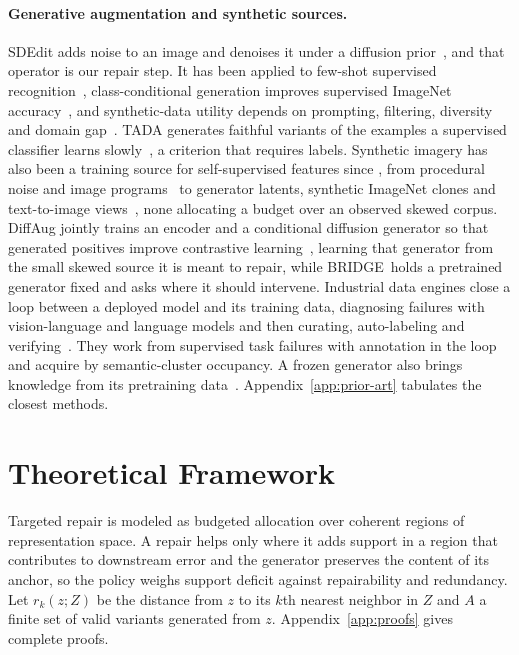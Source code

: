 \documentclass{article}
\newcommand{\method}{BRIDGE}
\begin{document}
\paragraph{Generative augmentation and synthetic sources.}
SDEdit adds noise to an image and denoises it under a diffusion prior~\citep{ho2020denoising,rombach2022highresolution,meng2022sdedit}, and that operator is our repair step. It has been applied to few-shot supervised recognition~\citep{trabucco2023effective}, class-conditional generation improves supervised ImageNet accuracy~\citep{azizi2023synthetic}, and synthetic-data utility depends on prompting, filtering, diversity and domain gap~\citep{he2023synthetic,fan2024scaling}. TADA generates faithful variants of the examples a supervised classifier learns slowly~\citep{nguyen2026tada}, a criterion that requires labels. Synthetic imagery has also been a training source for self-supervised features since \citet{ren2018crossdomain}, from procedural noise and image programs~\citep{baradad2021noise,baradad2022procedural} to generator latents, synthetic ImageNet clones and text-to-image views~\citep{jahanian2022generative,sariyildiz2023fake,tian2023stablerep}, none allocating a budget over an observed skewed corpus. DiffAug jointly trains an encoder and a conditional diffusion generator so that generated positives improve contrastive learning~\citep{zang2024diffaug}, learning that generator from the small skewed source it is meant to repair, while \method\ holds a pretrained generator fixed and asks where it should intervene. Industrial data engines close a loop between a deployed model and its training data, diagnosing failures with vision-language and language models and then curating, auto-labeling and verifying~\citep{liang2024aide,worker2022omniverse}. They work from supervised task failures with annotation in the loop and acquire by semantic-cluster occupancy. A frozen generator also brings knowledge from its pretraining data~\citep{li2023dreamteacher,tang2023dift,yu2025repa}. Appendix~\ref{app:prior-art} tabulates the closest methods.

\section{Theoretical Framework}
\label{sec:theory}
Targeted repair is modeled as budgeted allocation over coherent regions of representation space. A repair helps only where it adds support in a region that contributes to downstream error and the generator preserves the content of its anchor, so the policy weighs support deficit against repairability and redundancy. Let $r_k(z;Z)$ be the distance from $z$ to its $k$th nearest neighbor in $Z$ and $A$ a finite set of valid variants generated from $z$. Appendix~\ref{app:proofs} gives complete proofs.
\end{document}
